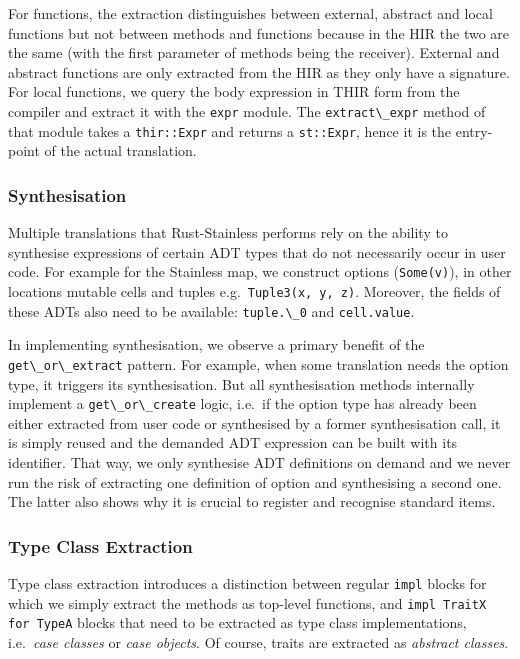 For functions, the extraction distinguishes between external, abstract
and local functions but not between methods and functions because in the
HIR the two are the same (with the first parameter of methods being the
receiver). External and abstract functions are only extracted from the
HIR as they only have a signature. For local functions, we query the
body expression in THIR form from the compiler and extract it with the
\passthrough{\lstinline!expr!} module. The
\passthrough{\lstinline!extract\_expr!} method of that module takes a
\passthrough{\lstinline!thir::Expr!} and returns a
\passthrough{\lstinline!st::Expr!}, hence it is the entry-point of the
actual translation.

\subsubsection{Synthesisation}

Multiple translations that Rust-Stainless performs rely on the ability
to synthesise expressions of certain ADT types that do not necessarily
occur in user code. For example for the Stainless map, we construct
options (\passthrough{\lstinline!Some(v)!}), in other locations mutable
cells and tuples e.g.~\passthrough{\lstinline!Tuple3(x, y, z)!}.
Moreover, the fields of these ADTs also need to be available:
\passthrough{\lstinline!tuple.\_0!} and
\passthrough{\lstinline!cell.value!}.

In implementing synthesisation, we observe a primary benefit of the
\passthrough{\lstinline!get\_or\_extract!} pattern. For example, when
some translation needs the option type, it triggers its synthesisation.
But all synthesisation methods internally implement a
\passthrough{\lstinline!get\_or\_create!} logic, i.e.~if the option type
has already been either extracted from user code or synthesised by a
former synthesisation call, it is simply reused and the demanded ADT
expression can be built with its identifier. That way, we only
synthesise ADT definitions on demand and we never run the risk of
extracting one definition of option and synthesising a second one. The
latter also shows why it is crucial to register and recognise standard
items.

\subsubsection{Type Class Extraction}

Type class extraction introduces a distinction between regular
\passthrough{\lstinline!impl!} blocks for which we simply extract the
methods as top-level functions, and
\passthrough{\lstinline!impl TraitX for TypeA!} blocks that need to be
extracted as type class implementations, i.e.~\emph{case classes} or
\emph{case objects}. Of course, traits are extracted as \emph{abstract
classes}.

